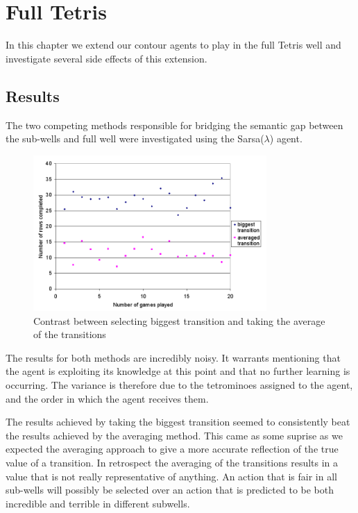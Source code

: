 \documentclass{rucsthesis}
\begin{document}
\chapter{Full Tetris}

In this chapter we extend our contour agents to play in the full Tetris well and investigate several side effects of this extension.

\section{Results}

The two competing methods responsible for bridging the semantic gap between the sub-wells and full well were investigated using the Sarsa($\lambda$) agent.

\begin{figure}[h]
\centering
\includegraphics[width=3.5in]{multisingle.png}
\caption{Contrast between selecting biggest transition and taking the average of the transitions}
\label{fig:multisingle}
\end{figure}

The results for both methods are incredibly noisy. It warrants mentioning that the agent is exploiting its knowledge at this point and that no further learning is occurring. The variance is therefore due to the tetrominoes assigned to the agent, and the order in which the agent receives them.

The results achieved by taking the biggest transition seemed to consistently beat the results achieved by the averaging method. This came as some suprise as we expected the averaging approach to give a more accurate reflection of the true value of a transition. In retrospect the averaging of the transitions results in a value that is not really representative of anything. An action that is fair in all sub-wells will possibly be selected over an action that is predicted to be both incredible and terrible in different subwells.
\end{document}
